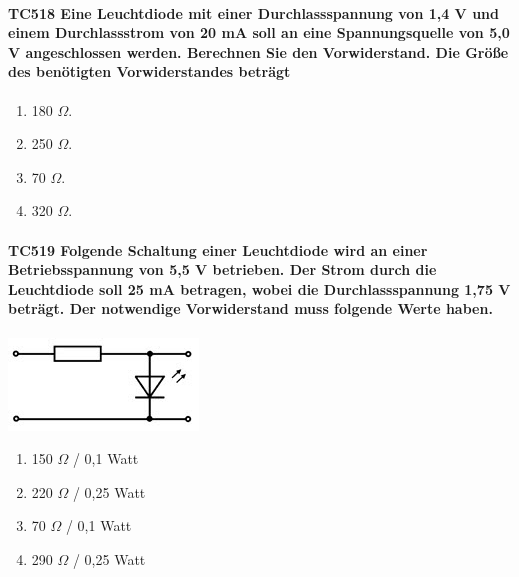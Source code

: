 \documentclass[8pt]{article}
\begin{document}
\begin{enumerate}
\begin{enumerate}[nolistsep,label=\Alph*]
{\begin{enumerate}[nolistsep,label=\Alph*]
\paragraph*{TC518 Eine Leuchtdiode mit einer Durchlassspannung von 1,4 V und einem Durchlassstrom von 20 mA soll an eine Spannungsquelle von 5,0 V angeschlossen werden. Berechnen Sie den Vorwiderstand. Die Größe des benötigten Vorwiderstandes beträgt}
\begin{enumerate}[nolistsep,label=\Alph*]
\item 180 $\Omega$.
\item 250 $\Omega$.
\item 70 $\Omega$.
\item 320 $\Omega$. 
\end{enumerate}

\paragraph*{TC519 Folgende Schaltung einer Leuchtdiode wird an einer Betriebsspannung von 5,5 V betrieben. Der Strom durch die Leuchtdiode soll 25 mA betragen, wobei die Durchlassspannung 1,75 V beträgt. Der notwendige Vorwiderstand muss folgende Werte haben.}
\begin{center}
	\begin{minipage}{\linewidth}
		\centering
		\includegraphics[scale=1.0]{pics/tc519_a.jpg}
	\end{minipage}
\end{center}
\begin{enumerate}[nolistsep,label=\Alph*]
\item 150 $\Omega$ / 0,1 Watt
\item 220 $\Omega$ / 0,25 Watt
\item 70 $\Omega$ / 0,1 Watt
\item 290 $\Omega$ / 0,25 Watt
\end{enumerate}


\end{enumerate}}
\end{enumerate}
\end{enumerate}
\end{document}
